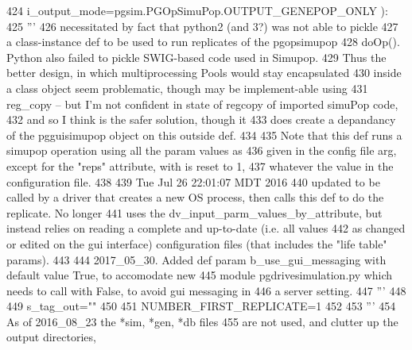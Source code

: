 \begin{DoxyCode}
424                                                 i\_output\_mode=pgsim.PGOpSimuPop.OUTPUT\_GENEPOP\_ONLY ):
425     \textcolor{stringliteral}{'''}
426 \textcolor{stringliteral}{    necessitated by fact that python2 (and 3?) was not able to pickle }
427 \textcolor{stringliteral}{    a class-instance def to be used to run replicates of the pgopsimupop}
428 \textcolor{stringliteral}{    doOp().  Python also failed to pickle SWIG-based code used in Simupop.}
429 \textcolor{stringliteral}{    Thus the better design, in which  multiprocessing Pools would stay  encapsulated }
430 \textcolor{stringliteral}{    inside a class object seem problematic, though may be implement-able using }
431 \textcolor{stringliteral}{    reg\_copy -- but I'm not confident in state of regcopy of imported simuPop code,}
432 \textcolor{stringliteral}{    and so  I think is the safer solution, though it}
433 \textcolor{stringliteral}{    does create a depandancy of the pgguisimupop object on this outside def.  }
434 \textcolor{stringliteral}{}
435 \textcolor{stringliteral}{    Note that this def runs a simupop operation using all the param values as}
436 \textcolor{stringliteral}{    given in the config file arg, except for the "reps" attribute, with is reset to 1,}
437 \textcolor{stringliteral}{    whatever the value in the configuration file.}
438 \textcolor{stringliteral}{}
439 \textcolor{stringliteral}{    Tue Jul 26 22:01:07 MDT 2016}
440 \textcolor{stringliteral}{    updated to be called by a driver that creates a new OS process, then calls this def to do the
       replicate.  No longer}
441 \textcolor{stringliteral}{    uses the dv\_input\_parm\_values\_by\_attribute, but instead relies on reading a complete and up-to-date
       (i.e. all values}
442 \textcolor{stringliteral}{    as changed or edited on the gui interface) configuration files (that includes the "life table" params).}
443 \textcolor{stringliteral}{}
444 \textcolor{stringliteral}{    2017\_05\_30. Added def param b\_use\_gui\_messaging with default value True, to accomodate new}
445 \textcolor{stringliteral}{    module pgdrivesimulation.py which needs to call with False, to avoid gui messaging in}
446 \textcolor{stringliteral}{    a server setting.}
447 \textcolor{stringliteral}{    '''}
448 
449     s\_tag\_out=\textcolor{stringliteral}{""}
450 
451     NUMBER\_FIRST\_REPLICATE=1
452 
453     \textcolor{stringliteral}{'''}
454 \textcolor{stringliteral}{    As of 2016\_08\_23 the *sim, *gen, *db files}
455 \textcolor{stringliteral}{    are not used, and clutter up the output directories,}

\end{DoxyCode}
